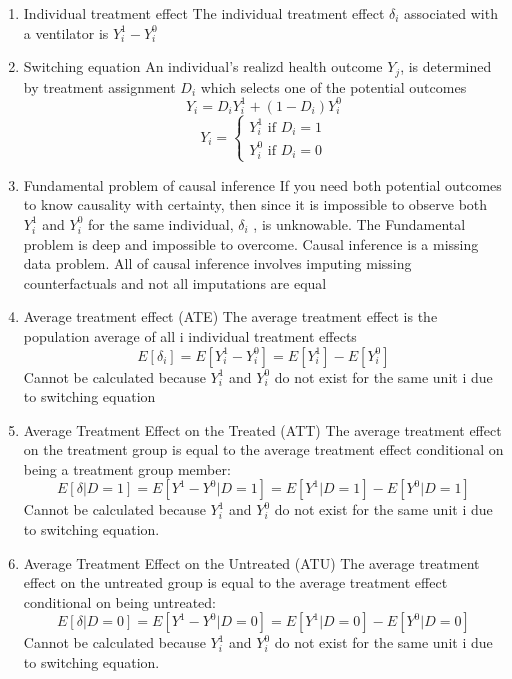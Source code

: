 \begin{enumerate}
    \item Individual treatment effect \ra The individual treatment effect $\delta_i$ associated with a ventilator is $Y^1_i - Y_i^0$
    \item Switching equation \ra An individual's realizd health outcome $Y_j$, is determined by treatment assignment $D_i$ which selects one of the potential outcomes
    \[
    Y_i = D_iY^1_i + (1 -D_i)Y_i^0
    \]
    \[
    Y_i = \begin{cases}
        Y_i^1 \text{ if } D_i = 1 \\

        Y^0_i \text{ if } D_i = 0
    \end{cases}
    \]
    \item Fundamental problem of causal inference \ra If you need both potential outcomes to know causality with certainty, then since it is impossible to observe both $Y_i^1$  and $Y_i^0$ for the same individual, $\delta_i$ , is unknowable. The Fundamental problem is deep and impossible to overcome. Causal inference is a missing data problem. All of causal inference involves imputing missing counterfactuals and not all imputations are equal
    \item  Average treatment effect (ATE) \ra The average treatment effect is the population average of all i individual treatment effects
    \[
    E[\delta_i] = E[Y_i^1 - Y_i^0] = E[Y_i^1] - E[Y_i^0]
    \]
    Cannot be calculated because $Y^1_i$ and $Y^0_i$ do not exist for the same unit i due to switching equation
    \item Average Treatment Effect on the Treated (ATT) \ra The average treatment effect on the treatment group is equal to the average treatment effect conditional on being a treatment group member:
    \[
    E[\delta|D=1] = E[Y^1 - Y^0 |D=1] = E[Y^1|D=1] - E[Y^0|D=1]
    \]
    Cannot be calculated because $Y^1_i$ and $Y^0_i$ do not exist for the same unit i due to switching equation.
    \item Average Treatment Effect on the Untreated (ATU) \ra The average treatment effect on the untreated group is equal to the average treatment effect conditional on being untreated:
    \[
    E[\delta|D=0] = E[Y^1-Y^0|D=0] = E[Y^1|D=0] - E[Y^0|D=0]
    \]
    Cannot be calculated because $Y^1_i$ and $Y^0_i$ do not exist for the same unit i due to switching equation.

\end{enumerate}

